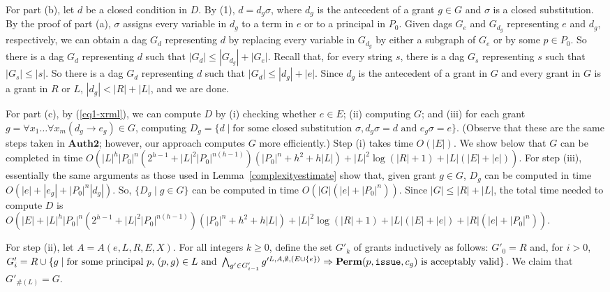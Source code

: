 \documentclass{acmtrans2m}
\newcommand{\rimp}{\Rightarrow}
\newcommand{\<}{
}
\renewcommand{\>}{\rangle}
\newcommand{\union}{\cup}
\newcommand{\len}[1]{|#1|}
\newcommand{\card}[1]{\#({#1})}
\newcommand{\Permitted}{\mathit{\bf Perm}}
\newcommand{\cd}{d}
\newcommand{\cc}{e}
\newcommand{\scc}{E}
\newcommand{\issue}{\mathtt{issue}}
\newcommand{\imp}{\rightarrow}
\newcommand{\XATwo}{\textbf{Auth2}}
\newcommand{\transwithE}[5]{#1^{#2, #3, #4, #5}}
\newcommand{\EX}{X}
\begin{document}
\begin{sloppypar}
For part (b), let $\cd$ be a closed condition in $D$.  By (1), $\cd = \cd_g\sigma$, where
$\cd_g$ is the antecedent of a grant $g \in G$ and $\sigma$ is a closed substitution.  By the
proof of part (a), $\sigma$ assigns every variable in $\cd_g$ to a term in $\cc$ or to a
principal in $P_0$.  Given dags $G_{\cc}$ and $G_{\cd_g }$ representing $\cc$ and $\cd_g$,
respectively, we can obtain a dag $G_{\cd}$ representing $\cd$ by replacing every variable in
$G_{\cd_g}$ by either a subgraph of $G_{\cc}$ or by some $p\in P_0$.  So there is a dag
$G_{\cd}$ representing $\cd$ such that $\len{G_{\cd}} \le \len{G_{\cd_g}}+\len{G_{\cc}}$.
Recall that, for every string $s$, there is a dag $G_{s}$ representing $s$ such that
$\len{G_{s}} \le \len{s}$.  So there is a dag $G_{\cd}$ representing $\cd$ such that
$\len{G_{\cd}}\le \len{\cd_g} + \len{\cc}$.  Since $\cd_g$ is the antecedent of a grant in $G$
and every grant in $G$ is a grant in $R$ or $L$, $\len{\cd_g} < \len{R}+\len{L}$, and we are
done.

For part (c), by (\ref{eq1-xrml}), we can compute $D$ by (i) checking whether $\cc \in \scc$;
(ii) computing $G$; and (iii) for each grant
$g = \forall x_1\ldots\forall x_m(\cd_g\imp\cc_g) \in G$, computing
$D_g = \{\cd \mid \mbox{for some closed substitution }\sigma, \cd_g\sigma = \cd\mbox{ and }
\cc_g\sigma = \cc\}$.  (Observe that these are the same steps taken in $\XATwo$; however, our
approach computes $G$ more efficiently.)  Step (i) takes time $O(\len{\scc})$.  We show below
that $G$ can be completed in time
$O(\len{L}^h\len{P_0}^n(2^{h-1} + \len{L}^2\len{P_0}^{n(h-1)})(\len{P_0}^n
+ h^2 + h\len{L}) + \len{L}^2 \log(\len{R}+1) + \len{L}(\len{E} + \len{e})).$
For step (iii), essentially the same arguments as those used in Lemma~\ref{complexityestimate}
show that, given grant $g \in G$, $D_g$ can be computed in time
$O(|\cc| + |\cc_g| + \len{P_0}^n|\cd_g|)$.  So, $\{D_g\mid g\in G\}$ can be computed in time
$O(|G|(|\cc| + \len{P_0}^n))$.  Since $\len{G}\le \len{R}+\len{L}$, the total time needed to
compute $D$ is
$O(\len{E} + \len{L}^h\len{P_0}^n(2^{h-1} + \len{L}^2\len{P_0}^{n(h-1)})(\len{P_0}^n + h^2 +
h\len{L}) + \len{L}^2 \log(\len{R}+1) + \len{L}(\len{E} + \len{e}) + \len{R}(\len{\cc} + \len{P_0}^n)).$

For step (ii), let $A  = A(\cc, L, R, \scc, \EX)$.  For all integers $k \ge 0$, define the set $G'_k$
of grants inductively as follows: $G'_0 = R$ and, for $i>0$,
$G'_i = R\union \{g\mid\mbox{for some principal $p$, } (p,g)\in L \mbox{ and }
\bigwedge_{g'\in G'_{i-1}}\transwithE{g'}{L}{A}{\emptyset}{(E\union\{\cc\})}\rimp
\Permitted(p, \issue, c_g)\mbox{ is acceptably valid}\}$.  We claim that $G'_{\card{L}} = G$.


\end{sloppypar}
\end{document}

